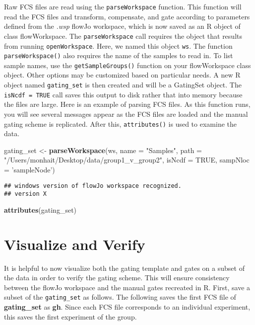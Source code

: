 \documentclass[]{book}
\newenvironment{Shaded}{\begin{snugshade}}{\end{snugshade}}
\newcommand{\DataTypeTok}[1]{\textcolor[rgb]{0.13,0.29,0.53}{#1}}
\newcommand{\KeywordTok}[1]{\textcolor[rgb]{0.13,0.29,0.53}{\textbf{#1}}}
\newcommand{\NormalTok}[1]{#1}
\newcommand{\OtherTok}[1]{\textcolor[rgb]{0.56,0.35,0.01}{#1}}
\newcommand{\StringTok}[1]{\textcolor[rgb]{0.31,0.60,0.02}{#1}}
\begin{document}
Raw FCS files are read using the \texttt{parseWorkspace} function. This function will read the FCS files and transform, compensate, and gate according to parameters defined from the \emph{.wsp} flowJo workspace, which is now saved as an R object of class flowWorkspace. The \texttt{parseWorkspace} call requires the object that results from running \texttt{openWorkspace}. Here, we named this object \texttt{ws}. The function \texttt{parseWorkspace()} also requires the name of the samples to read in. To list sample names, use the \texttt{getSampleGroups()} function on your flowWorkspace class object. Other options may be customized based on particular needs. A new R object named \texttt{gating\_set} is then created and will be a GatingSet object. The \texttt{isNcdf\ =\ TRUE} call saves this output to disk rather that into memory because the files are large. Here is an example of parsing FCS files. As this function runs, you will see several messages appear as the FCS files are loaded and the manual gating scheme is replicated. After this, \texttt{attributes()} is used to examine the data.

\begin{Shaded}
\begin{Highlighting}[]
\NormalTok{gating_set <-}\StringTok{ }\KeywordTok{parseWorkspace}\NormalTok{(ws, }\DataTypeTok{name =} \StringTok{"Samples"}\NormalTok{, }\DataTypeTok{path =} \StringTok{"/Users/monhait/Desktop/data/group1_v_group2"}\NormalTok{, }\DataTypeTok{isNcdf =} \OtherTok{TRUE}\NormalTok{, }\DataTypeTok{sampNloc =} \StringTok{'sampleNode'}\NormalTok{)}
\end{Highlighting}
\end{Shaded}

\begin{verbatim}
## windows version of flowJo workspace recognized.
## version X
\end{verbatim}

\begin{Shaded}
\begin{Highlighting}[]
\KeywordTok{attributes}\NormalTok{(gating_set)}
\end{Highlighting}
\end{Shaded}

\hypertarget{visualize-and-verify}{%
\section{Visualize and Verify}\label{visualize-and-verify}}

It is helpful to now visualize both the gating template and gates on a subset of the data in order to verify the gating scheme. This will ensure consistency between the flowJo workspace and the manual gates recreated in R. First, save a subset of the \texttt{gating\_set} as follows. The following saves the first FCS file of \textbf{gating\_set} as \textbf{gh}. Since each FCS file corresponds to an individual experiment, this saves the first experiment of the group.
\end{document}
